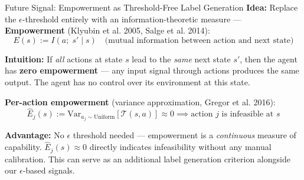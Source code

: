 \documentclass[11pt,aspectratio=169]{beamer}
\begin{document}
\begin{frame}{Future Signal: Empowerment as Threshold-Free Label Generation}
    \textbf{Idea:} Replace the $\epsilon$-threshold entirely with an information-theoretic measure — \textbf{Empowerment} (Klyubin et al. 2005, Salge et al. 2014):
    \begin{equation}
        E(s) := I(a;\; s' \mid s) \quad \text{(mutual information between action and next state)}
    \end{equation}

    \textbf{Intuition:} If \textit{all} actions at state $s$ lead to the \textit{same} next state $s'$, then the agent has \textbf{zero empowerment} — any input signal through actions produces the same output. The agent has no control over its environment at this state.

    \vspace{0.2cm}
    \textbf{Per-action empowerment} (variance approximation, Gregor et al. 2016):
    \begin{equation}
        \hat{E}_j(s) := \text{Var}_{a_j \sim \text{Uniform}}[\mathcal{T}(s, a)] \approx 0 \implies \text{action } j \text{ is infeasible at } s
    \end{equation}

    \vspace{0.2cm}
    \textbf{Advantage:} No $\epsilon$ threshold needed — empowerment is a \textit{continuous} measure of capability. $\hat{E}_j(s) \approx 0$ directly indicates infeasibility without any manual calibration. This can serve as an additional label generation criterion alongside our $\epsilon$-based signals.
\end{frame}
\end{document}

